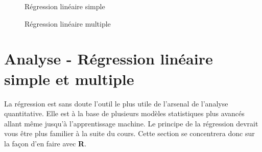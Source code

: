 \documentclass[10.5pt,a4paper]{article}
\begin{document}
   \begin{figure}[H]
    \centering
    \caption{Régression linéaire simple}
    \label{anaReg1}
    \end{figure}
    
      \begin{figure}[H]
    \centering
    \caption{Régression linéaire multiple}
    \label{anaReg2}
    \end{figure}

  
  \section{Analyse - Régression linéaire simple et multiple}
  La régression est sans doute l'outil le plus utile de l'arsenal de l'analyse quantitative. Elle est à la base de plusieurs modèles statistiques plus avancés allant même jusqu'à l'apprentissage machine. Le principe de la régression devrait vous être plus familier à la suite du cours. Cette section se concentrera donc sur la façon d'en faire avec \textbf{R}.
\end{document}
